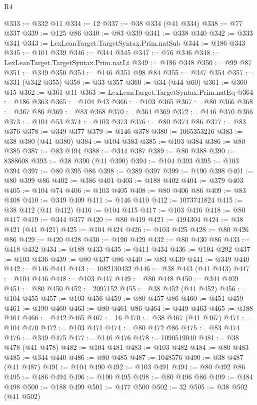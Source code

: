 \begin{lexlean}{R4}
\begin{coremodule}
@333 := @332 @11
@334 := 12
@337 := @38 @334 (@41 @334)
@338 := @77 @337
@339 := @125 @86
@340 := @83 @339
@341 := @338 @340
@342 := @333 @341
@343 := LexLeanTarget.TargetSyntax.Prim.natSub
@344 := @186 @343
@345 := @101 @339
@346 := @344 @345
@347 := @76 @346
@348 := LexLeanTarget.TargetSyntax.Prim.natLt
@349 := @186 @348
@350 := @99 @87
@351 := @349 @350
@354 := @146 @351 @98 @84
@355 := @347 @354
@357 := @331 (@342 @355)
@358 := @33 @357
@360 := @34 (@44 @60)
@361 := @360 @15
@362 := @361 @11
@363 := LexLeanTarget.TargetSyntax.Prim.natEq
@364 := @186 @363
@365 := @104 @43
@366 := @103 @365
@367 := @80 @366
@368 := @367 @86
@369 := @83 @368
@370 := @364 @369
@372 := @146 @370 @366
@373 := @104 @53
@374 := @103 @373
@376 := @80 @374 @86
@377 := @83 @376
@378 := @349 @377
@379 := @146 @378
@380 := 1065353216
@383 := @38 @380 (@41 @380)
@384 := @104 @383
@385 := @103 @384
@386 := @80 @385
@387 := @83 @194
@388 := @344 @387
@389 := @80 @388
@390 := 8388608
@393 := @38 @390 (@41 @390)
@394 := @104 @393
@395 := @103 @394
@397 := @80 @395 @86
@398 := @389 @397
@399 := @190 @398
@401 := @80 @399 @86
@402 := @386 @401
@403 := @188 @402
@404 := @379 @403
@405 := @104 @74
@406 := @103 @405
@408 := @80 @406 @86
@409 := @83 @408
@410 := @349 @409
@411 := @146 @410
@412 := 1073741824
@415 := @38 @412 (@41 @412)
@416 := @104 @415
@417 := @103 @416
@418 := @80 @417
@419 := @344 @377
@420 := @80 @419
@421 := 4194304
@424 := @38 @421 (@41 @421)
@425 := @104 @424
@426 := @103 @425
@428 := @80 @426 @86
@429 := @420 @428
@430 := @190 @429
@432 := @80 @430 @86
@433 := @418 @432
@434 := @188 @433
@435 := @411 @434
@436 := @104 @292
@437 := @103 @436
@439 := @80 @437 @86
@440 := @83 @439
@441 := @349 @440
@442 := @146 @441
@443 := 1082130432
@446 := @38 @443 (@41 @443)
@447 := @104 @446
@448 := @103 @447
@449 := @80 @448
@450 := @344 @409
@451 := @80 @450
@452 := 2097152
@455 := @38 @452 (@41 @452)
@456 := @104 @455
@457 := @103 @456
@459 := @80 @457 @86
@460 := @451 @459
@461 := @190 @460
@463 := @80 @461 @86
@464 := @449 @463
@465 := @188 @464
@466 := @442 @465
@467 := 16
@470 := @38 @467 (@41 @467)
@471 := @104 @470
@472 := @103 @471
@474 := @80 @472 @86
@475 := @83 @474
@476 := @349 @475
@477 := @146 @476
@478 := 1090519040
@481 := @38 @478 (@41 @478)
@482 := @104 @481
@483 := @103 @482
@484 := @80 @483
@485 := @344 @440
@486 := @80 @485
@487 := 1048576
@490 := @38 @487 (@41 @487)
@491 := @104 @490
@492 := @103 @491
@494 := @80 @492 @86
@495 := @486 @494
@496 := @190 @495
@498 := @80 @496 @86
@499 := @484 @498
@500 := @188 @499
@501 := @477 @500
@502 := 32
@505 := @38 @502 (@41 @502)

\end{coremodule}
\end{lexlean}
